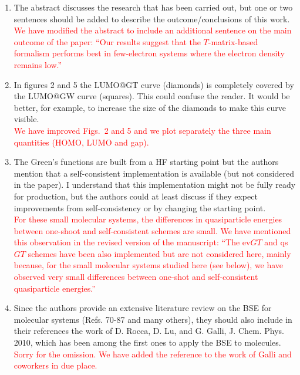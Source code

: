 \documentclass[10pt]{letter}
\newcommand{\alert}[1]{\textcolor{red}{#1}}
\begin{document}
\begin{letter}
\begin{enumerate}

\item 
{The abstract discusses the research that has been carried out, but one or two sentences should be added to describe the outcome/conclusions of this work.}
\\
\alert{
We have modified the abstract to include an additional sentence on the main outcome of the paper: ``Our results suggest that the $T$-matrix-based formalism performs best in few-electron systems where the electron density remains low.''
}

\item 
{In figures 2 and 5 the LUMO@GT curve (diamonds) is completely covered by the LUMO@GW curve (squares). 
This could confuse the reader. 
It would be better, for example, to increase the size of the diamonds to make this curve visible.}
\\
\alert{
We have improved Figs.~2 and 5 and we plot separately the three main quantities (HOMO, LUMO and gap).
}

\item 
{The Green's functions are built from a HF starting point but the authors mention that a self-consistent implementation is available (but not considered in the paper). 
I understand that this implementation might not be fully ready for production, but the authors could at least discuss if they expect improvements from self-consistency or by changing the starting point.}
\\
\alert{
For these small molecular systems, the differences in quasiparticle energies between one-shoot and self-consistent schemes are small.
We have mentioned this observation in the revised version of the manuscript: ``The ev$GT$ and qs$GT$ schemes have been also implemented but are not considered here, mainly because, for the small molecular systems studied here (see below), we have observed very small differences between one-shot and self-consistent quasiparticle energies.''
}

\item 
{Since the authors provide an extensive literature review on the BSE for molecular systems (Refs. 70-87 and many others), they should also include in their references the work of D. Rocca, D. Lu, and G. Galli, J. Chem. Phys. 2010, which has been among the first ones to apply the BSE to molecules. 
}
\\
\alert{
Sorry for the omission. 
We have added the reference to the work of Galli and coworkers in due place.
}

\end{enumerate}


\end{letter}
\end{document}
